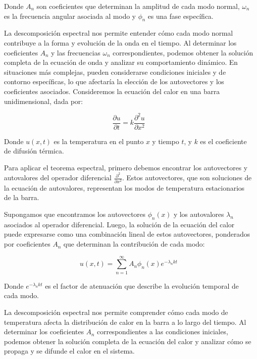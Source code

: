 \documentclass{article}
\begin{document}
    Donde \(A_n\) son coeficientes que determinan la amplitud de cada modo normal, \(\omega_n\) es la frecuencia angular asociada al modo y \(\phi_n\) es una fase específica.
    
    La descomposición espectral nos permite entender cómo cada modo normal contribuye a la forma y evolución de la onda en el tiempo. Al determinar los coeficientes \(A_n\) y las frecuencias \(\omega_n\) correspondientes, podemos obtener la solución completa de la ecuación de onda y analizar su comportamiento dinámico. En situaciones más complejas, pueden considerarse condiciones iniciales y de contorno específicas, lo que afectaría la elección de los autovectores y los coeficientes asociados.
    Consideremos la ecuación del calor en una barra unidimensional, dada por:

    \begin{equation}
    \frac{{\partial u}}{{\partial t}} = k \frac{{\partial^2 u}}{{\partial x^2}}
    \end{equation}

    Donde \(u(x, t)\) es la temperatura en el punto \(x\) y tiempo \(t\), y \(k\) es el coeficiente de difusión térmica.

    Para aplicar el teorema espectral, primero debemos encontrar los autovectores y autovalores del operador diferencial \(\frac{{\partial^2}}{{\partial x^2}}\). Estos autovectores, que son soluciones de la ecuación de autovalores, representan los modos de temperatura estacionarios de la barra.

    Supongamos que encontramos los autovectores \(\phi_n(x)\) y los autovalores \(\lambda_n\) asociados al operador diferencial. Luego, la solución de la ecuación del calor puede expresarse como una combinación lineal de estos autovectores, ponderados por coeficientes \(A_n\) que determinan la contribución de cada modo:

    \begin{equation}
    u(x, t) = \sum_{n=1}^{\infty} A_n \phi_n(x) e^{-\lambda_n k t}
    \end{equation}

    Donde \(e^{-\lambda_n k t}\) es el factor de atenuación que describe la evolución temporal de cada modo.

    La descomposición espectral nos permite comprender cómo cada modo de temperatura afecta la distribución de calor en la barra a lo largo del tiempo. Al determinar los coeficientes \(A_n\) correspondientes a las condiciones iniciales, podemos obtener la solución completa de la ecuación del calor y analizar cómo se propaga y se difunde el calor en el sistema.
\end{document}
